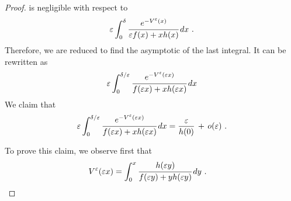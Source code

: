 \documentclass[reqno, 12pt, a4paper]{amsart}
\theoremstyle{plain}
\theoremstyle{definition}
\begin{document}
\begin{proof}
is negligible with respect to 
\begin{equation}
\begin{split}
 \varepsilon \int_0^{\delta} \cfrac{e^{- V^\varepsilon (x) }}{\varepsilon f(x) +x h(x)} \, dx \ .
\end{split}
\end{equation}
Therefore, we are reduced to find the asymptotic of the last integral. It can be rewritten as
\begin{equation}
\begin{split}
\varepsilon \int_0^{\delta/\varepsilon} \cfrac{e^{- V^\varepsilon (\varepsilon x) }}{f(\varepsilon x) +x h(\varepsilon x)} \, dx 
\end{split}
\end{equation}
We claim that 
\begin{equation}
\label{eq:maincontribE}
\begin{split}
\varepsilon \int_0^{\delta/\varepsilon} \cfrac{e^{- V^\varepsilon (\varepsilon x) }}{f(\varepsilon x) +x h(\varepsilon x)} \, dx = \frac{\varepsilon}{h(0)}  \, + \, o(\varepsilon) \ .
\end{split}
\end{equation}

\bigskip 

To prove this claim, we observe first that 
\begin{equation}
\begin{split}
V^\varepsilon (\varepsilon x) &= \int_0^x \cfrac{h(\varepsilon y)}{f(\varepsilon y) + y h(\varepsilon y)} \, dy \ .
\end{split}
\end{equation}



\end{proof}
\end{document}
